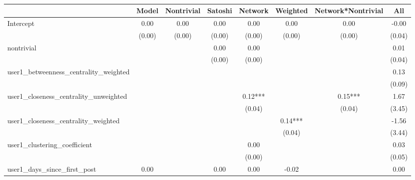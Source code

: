 \begin{table}
\caption{}
\begin{center}
\begin{tabular}{lccccccc}
\hline
                                      & Model    & Nontrivial & Satoshi & Network & Weighted & Network*Nontrivial &     All       \\
\hline
\hline

Intercept                             & 0.00     & 0.00       & 0.00    & 0.00    & 0.00     & 0.00               & -0.00         \\
                                      & (0.00)   & (0.00)     & (0.00)  & (0.00)  & (0.00)   & (0.00)             & (0.04)        \\
nontrivial                            &          &            & 0.00    & 0.00    &          &                    & 0.01          \\
                                      &          &            & (0.00)  & (0.00)  &          &                    & (0.04)        \\
user1_betweenness_centrality_weighted &          &            &         &         &          &                    & 0.13          \\
                                      &          &            &         &         &          &                    & (0.09)        \\
user1_closeness_centrality_unweighted &          &            &         & 0.12*** &          & 0.15***            & 1.67          \\
                                      &          &            &         & (0.04)  &          & (0.04)             & (3.45)        \\
user1_closeness_centrality_weighted   &          &            &         &         & 0.14***  &                    & -1.56         \\
                                      &          &            &         &         & (0.04)   &                    & (3.44)        \\
user1_clustering_coefficient          &          &            &         & 0.00    &          &                    & 0.03          \\
                                      &          &            &         & (0.00)  &          &                    & (0.05)        \\
user1_days_since_first_post           & 0.00     &            & 0.00    & 0.00    & -0.02    &                    & 0.00          \\

\end{tabular}
\end{center}
\end{table}
